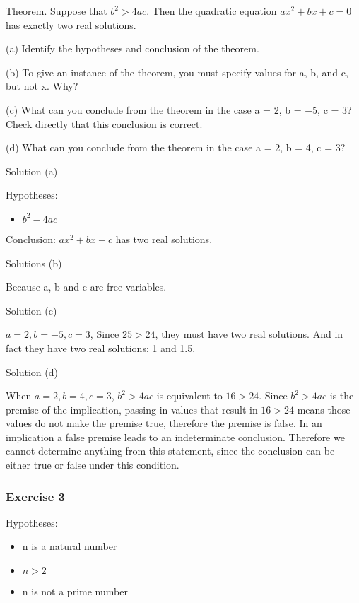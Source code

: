 Theorem. Suppose that $b^2 > 4ac$. Then the quadratic equation $ax^2 +
bx + c = 0$ has exactly two real solutions.

(a) Identify the hypotheses and conclusion of the theorem.

(b) To give an instance of the theorem, you must specify values for a, b,
and c, but not x. Why?

(c) What can you conclude from the theorem in the case a = 2, b = −5,
c = 3? Check directly that this conclusion is correct.

(d) What can you conclude from the theorem in the case a = 2, b = 4, c
= 3?

Solution (a)

Hypotheses:
\begin{itemize}
\item $b^2 - 4ac$
\end{itemize}

Conclusion: $ax^2 + bx + c$ has two real solutions.

Solutions (b)

Because a, b and c are free variables.

Solution (c)

$a = 2, b = -5, c=3$, Since $25 > 24$, they must have two real
solutions. And in fact they have two real solutions: 1 and 1.5.

Solution (d)

When $a =2, b=4, c=3$, $b^2 > 4ac$ is equivalent to $16 > 24$.
Since $b^2 > 4ac$ is the premise of the implication, passing in values
that result in $16 > 24$ means those values do not make the premise
true, therefore the premise is false. In an implication a false premise
leads to an indeterminate conclusion. Therefore we cannot determine
anything from this statement, since the conclusion can be either
true or false under this condition.

\subsubsection{Exercise 3}

Hypotheses:
\begin{itemize}
\item n is a natural number
\item $n > 2$
\item n is not a prime number
\end{itemize}

